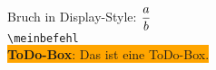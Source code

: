 \newcommand{\ds}{\ensuremath\displaystyle}
Bruch in Display-Style: $\ds \frac{a}{b}$\\

\newcommand{\meinbefehl}[1]{\texttt{\textbackslash#1}}
\meinbefehl{meinbefehl}\\

\newcommand{\todo}[2]{\colorbox{orange}{\textbf{#1}: {#2}}}
\todo{ToDo-Box}{Das ist eine ToDo-Box.}
